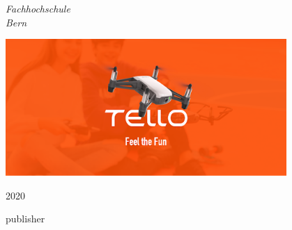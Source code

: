 \begin{titlepage}
	\vspace{0.5\baselineskip} %

	\textit{Fachhochschule \\ Bern} %

	\vfill %


	\begin{center}
	\includegraphics[width=0.8\textwidth]{./resources/01_front_image.png}
	\end{center}

	\vspace{0.3\baselineskip} %

	2020 %

	{\large publisher} %

\end{titlepage}
